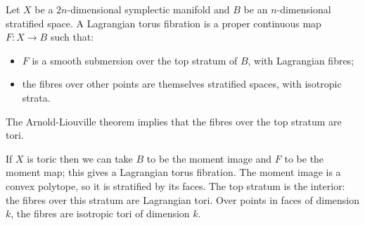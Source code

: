 \documentclass{article}
\begin{document}
\begin{Definition}
Let \(X\) be a \(2n\)-dimensional symplectic manifold and \(B\) be
an \(n\)-dimensional stratified space. A Lagrangian torus fibration
is a proper continuous map \(F\colon X\to B\) such that:
\begin{itemize}
\item \(F\) is a smooth submersion over the top stratum of \(B\), with
Lagrangian fibres;
\item the fibres over other points are themselves stratified spaces,
with isotropic strata.


\end{itemize}
\end{Definition}
\begin{Remark}
The Arnold-Liouville theorem implies that the fibres over the top
stratum are tori.


\end{Remark}
\begin{Example}
If \(X\) is toric then we can take \(B\) to be the moment image and
\(F\) to be the moment map; this gives a Lagrangian torus
fibration. The moment image is a convex polytope, so it is
stratified by its faces. The top stratum is the interior: the fibres
over this stratum are Lagrangian tori. Over points in faces of
dimension \(k\), the fibres are isotropic tori of dimension \(k\).


\end{Example}
\end{document}
